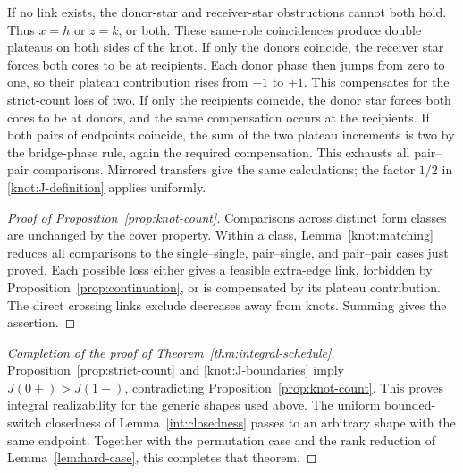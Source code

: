 If no link exists, the donor-star and receiver-star obstructions
cannot both hold.  Thus \(x=h\) or \(z=k\), or both.  These
same-role coincidences produce double plateaus on both sides of the
knot.  If only the donors coincide, the receiver star forces both
cores to be at recipients.  Each donor phase then jumps from zero
to one, so their plateau contribution rises from \(-1\) to \(+1\).
This compensates for the strict-count loss of two.  If only the
recipients coincide, the donor star forces both cores to be at
donors, and the same compensation occurs at the recipients.  If both
pairs of endpoints coincide, the sum of the two plateau increments
is two by the bridge-phase rule, again the required compensation.  This exhausts all pair--pair
comparisons.  Mirrored transfers give the same calculations; the
factor \(1/2\) in \eqref{knot:J-definition} applies uniformly.

\begin{proof}[Proof of Proposition~\ref{prop:knot-count}]
Comparisons across distinct form classes are unchanged by the cover
property.  Within a class, Lemma~\ref{knot:matching} reduces all
comparisons to the single--single, pair--single, and pair--pair cases
just proved.  Each possible loss either gives a feasible extra-edge
link, forbidden by Proposition~\ref{prop:continuation}, or is
compensated by its plateau contribution.  The direct crossing links
exclude decreases away from knots.  Summing gives the assertion.
\end{proof}

\begin{proof}[Completion of the proof of Theorem~\ref{thm:integral-schedule}]
Proposition~\ref{prop:strict-count} and
\eqref{knot:J-boundaries} imply \(J(0+)>J(1-)\), contradicting
Proposition~\ref{prop:knot-count}.  This proves integral realizability
for the generic shapes used above.  The uniform bounded-switch
closedness of Lemma~\ref{int:closedness} passes to an arbitrary shape
with the same endpoint.  Together with the permutation case and the rank
reduction of Lemma~\ref{lem:hard-case}, this completes that theorem.
\end{proof}
